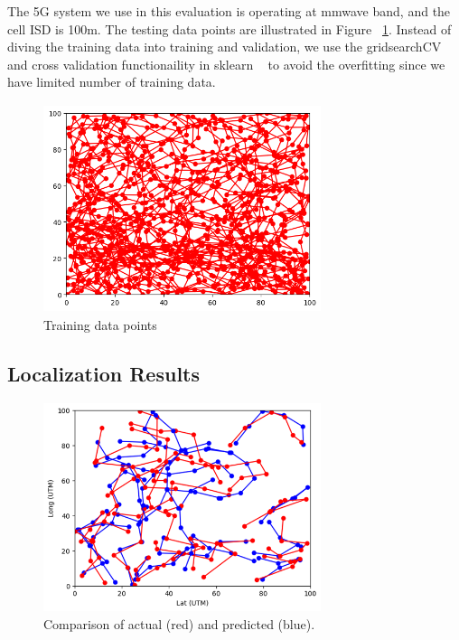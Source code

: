 \documentclass[conference, 10pt]{IEEEtran}
\begin{document}
The 5G system we use in this evaluation is operating at mmwave band, and the cell ISD is 100m. The testing data points are illustrated in 
Figure ~\ref{fig:training}. Instead of diving the training data into training and validation, we use the gridsearchCV and cross validation functionaility in 
sklearn ~\cite{sklearn} to avoid the overfitting since we have limited number of training data.

\begin{figure}[t]
	\begin{center}
	\includegraphics[height=2.4in,width=3.2in]{./GM_training.png}
	\caption{\label{fig:training}
	{\small Training data points}}
	\end{center}
	\end{figure}		

\subsection{Localization Results}


\begin{figure}[t]
\begin{center}
\includegraphics[height=2.4in,width=3.2in]{./Combined_path_illustration.png}
\caption{\label{fig:toyeg}
{\small Comparison of actual (red) and predicted (blue).}}
\end{center}
\end{figure}
\end{document}
